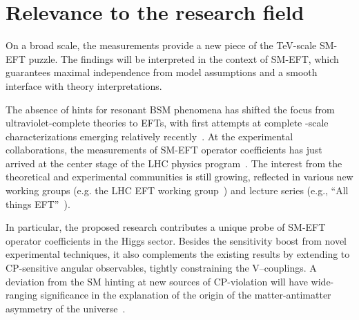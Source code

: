 \documentclass[a4paper,11pt]{article}
\renewcommand{\PV}{{{{V}}}\xspace}
\begin{document}
\section{Relevance to the research field}

On a broad scale, the measurements provide a new piece of the TeV-scale SM-EFT puzzle. 
The findings will be interpreted in the context of SM-EFT, which guarantees maximal independence from model assumptions and a smooth interface with theory interpretations.  

The absence of hints for resonant BSM phenomena has shifted the focus from ultraviolet-complete theories to EFTs, with first attempts at complete \TeV-scale characterizations emerging relatively recently~\cite{Ellis:2018gqa,Ellis:2020unq,Ethier:2021bye}.
At the experimental collaborations, the measurements of SM-EFT operator coefficients has just arrived at the center stage of the LHC physics program~\cite{CMS:2021nnc,CMS:2021aly,CMS:2021gme}.
The interest from the theoretical and experimental communities is still growing, reflected in various new working groups (e.g. the  LHC EFT working group~\cite{LHC_EFT_WG}) and lecture series (e.g., ``All things EFT''~\cite{All_EFT}).



In particular, the proposed research contributes a unique probe of SM-EFT operator coefficients in the Higgs sector.
Besides the sensitivity boost from novel experimental techniques, it also complements the existing results by extending to CP-sensitive angular observables, tightly constraining the \PV--\PH couplings.
A deviation from the SM hinting at new sources of CP-violation will have wide-ranging significance in the explanation of the origin of the matter-antimatter asymmetry of the universe~\cite{Cohen:1997ac,Damgaard:2015con,Grzadkowski:2018nbc}.


\end{document}
